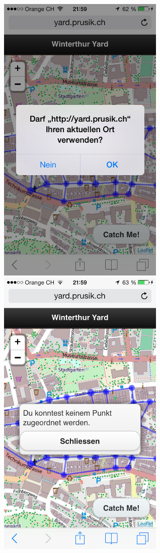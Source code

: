 \documentclass[11pt]{article}
\begin{document}
\includegraphics[width=8cm]{Bilder/Position.jpg}
\includegraphics[width=8cm]{Bilder/KeinePosition.jpg}
\end{document}
